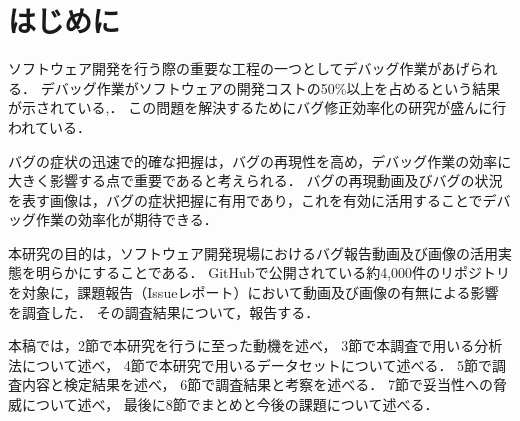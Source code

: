 \section{はじめに\label{intro}}
ソフトウェア開発を行う際の重要な工程の一つとしてデバッグ作業があげられる．
デバッグ作業がソフトウェアの開発コストの50\%以上を占めるという結果が示されている\cite{Evaluating_Effectiveness},\cite{Auto_Repair}．
この問題を解決するためにバグ修正効率化の研究が盛んに行われている．

バグの症状の迅速で的確な把握は，バグの再現性を高め，デバッグ作業の効率に大きく影響する点で重要であると考えられる．
バグの再現動画及びバグの状況を表す画像は，バグの症状把握に有用であり，これを有効に活用することでデバッグ作業の効率化が期待できる．

本研究の目的は，ソフトウェア開発現場におけるバグ報告動画及び画像の活用実態を明らかにすることである．
GitHubで公開されている約4,000件のリポジトリを対象に，課題報告（Issueレポート）において動画及び画像の有無による影響を調査した．
その調査結果について，報告する．

本稿では，2節で本研究を行うに至った動機を述べ，
3節で本調査で用いる分析法について述べ，
4節で本研究で用いるデータセットについて述べる．
5節で調査内容と検定結果を述べ，
6節で調査結果と考察を述べる．
7節で妥当性への脅威について述べ，
最後に8節でまとめと今後の課題について述べる．
